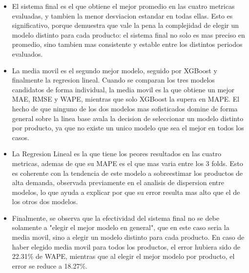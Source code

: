 \begin{itemize}
    \item El sistema final es el que obtiene el mejor promedio en las cuatro metricas evaluadas, y tambien la menor desviacion estandar en todas ellas. Esto es significativo, porque demuestra que vale la pena la complejidad de elegir un modelo distinto para cada producto: el sistema final no solo es mas preciso en promedio, sino tambien mas consistente y estable entre los distintos periodos evaluados.
    \item La media movil es el segundo mejor modelo, seguido por XGBoost y finalmente la regresion lineal. Cuando se comparan los tres modelos candidatos de forma individual, la media movil es la que obtiene un mejor MAE, RMSE y WAPE, mientras que solo XGBoost la supera en MAPE. El hecho de que ninguno de los dos modelos mas sofisticados domine de forma general sobre la linea base avala la decision de seleccionar un modelo distinto por producto, ya que no existe un unico modelo que sea el mejor en todos los casos.
    \item La Regresion Lineal es la que tiene los peores resultados en las cuatro metricas, ademas de que su MAPE es el que mas varia entre los 3 folds. Esto es coherente con la tendencia de este modelo a sobreestimar los productos de alta demanda, observada previamente en el analisis de dispersion entre modelos, lo que ayuda a explicar por que su error resulta mas alto que el de los otros dos modelos.
    \item Finalmente, se observa que la efectividad del sistema final no se debe solamente a "elegir el mejor modelo en general", que en este caso seria la media movil, sino a elegir un modelo distinto para cada producto. En caso de haber elegido media movil para todos los productos, el error hubiera sido de 22.31\% de WAPE, mientras que al elegir el mejor modelo por producto, el error se reduce a 18.27\%.
\end{itemize}